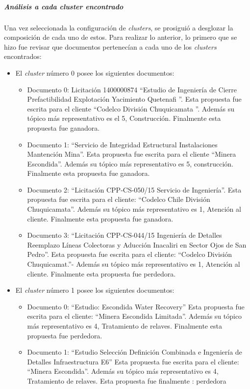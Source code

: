 \subparagraph{Análisis a cada cluster encontrado}
\subparagraph*{}
    Una vez seleccionada la configuración de \textit{clusters}, se prosiguió a desglozar la composición de cada uno de estos. Para realizar lo anterior, lo primero que se hizo fue revisar que documentos pertenecían a cada uno de los \textit{clusters} encontrados:
    
    \begin{itemize}
        \item El \textit{cluster} número 0 posee los siguientes documentos:
    \begin{itemize}
        \item Documento 0: Licitación 1400000874 ``Estudio de Ingeniería de Cierre Prefactibilidad Explotación Yacimiento Quetenaﬁ ''.
        Esta propuesta fue escrita para el cliente ``Codelco División Chuquicamata ''. Además su tópico más representativo es el 5, Construcción. Finalmente esta propuesta fue ganadora.
        
        \item Documento 1:  ``Servicio de Integridad Estructural Instalaciones Mantención Mina''.
        Esta propuesta fue escrita para el cliente ``Minera Escondida''. Además su tópico más representativo es 5, construcción. Finalmente esta propuesta fue ganadora.
        
        \item Documento 2: ``Licitación CPP-CS-050/15 Servicio de Ingeniería''. Esta propuesta fue escrita para el cliente: ``Codelco Chile División Chuquicamata''. Además su tópico más representativo es 1, Atención al cliente. Finalmente esta propuesta fue ganadora.
        
        \item Documento 3: ``Licitación CPP-CS-044/15 Ingeniería de Detalles Reemplazo Líneas Colectoras y Aducción Inacaliri en Sector Ojos de San Pedro''.
        Esta propuesta fue escrita para el cliente: ``Codelco División Chuquicamat.''- 
        Además su tópico más representativo es 1, Atención al cliente. Finalmente esta propuesta fue perdedora.
    \end{itemize}
    \item El \textit{cluster} número 1 posee los siguientes documentos:
        \begin{itemize}
            \item Documento 0: ``Estudio: Escondida Water Recovery''
            Esta propuesta fue escrita para el cliente: ``Minera Escondida Limitada''. Además su tópico más representativo es 4, Tratamiento de relaves.
            Finalmente esta propuesta fue perdedora.            
            \item Documento 1: ``Estudio Selección Definición Combinada e Ingeniería de Detalles Infraestructura E6''
            Esta propuesta fue escrita para el cliente: ``Minera Escondida''. Además su tópico más representativo es 4, Tratamiento de relaves.
            Esta propuesta fue finalmente : perdedora


\end{itemize}
\end{itemize}
